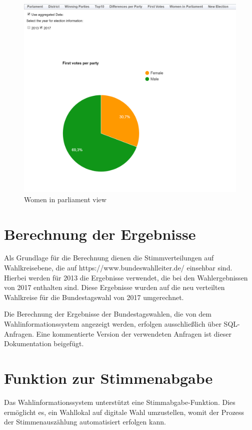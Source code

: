 \documentclass[a4paper]{scrreprt}
\begin{document}
\begin{figure}[H]
\centering
\includegraphics[width=\textwidth]{images/female_in_parliament.png}
\caption {Women in parliament view}
\end{figure}


\section{Berechnung der Ergebnisse}

Als Grundlage für die Berechnung dienen die Stimmverteilungen auf Wahlkreisebene, die auf https://www.bundeswahlleiter.de/ einsehbar sind. Hierbei werden für 2013 die Ergebnisse verwendet, die bei den Wahlergebnissen von 2017 enthalten sind. Diese Ergebnisse wurden auf die neu verteilten Wahlkreise für die Bundestagswahl von 2017 umgerechnet.

Die Berechnung der Ergebnisse der Bundestagswahlen, die von dem Wahlinformationssystem angezeigt werden, erfolgen ausschließlich über SQL-Anfragen. Eine kommentierte Version der verwendeten Anfragen ist dieser Dokumentation beigefügt. 


\section{Funktion zur Stimmenabgabe}

Das Wahlinformationssystem unterstützt eine Stimmabgabe-Funktion.
Dies ermöglicht es, ein Wahllokal auf digitale Wahl umzustellen, womit der Prozess der Stimmenauszählung automatisiert erfolgen kann.
\end{document}
